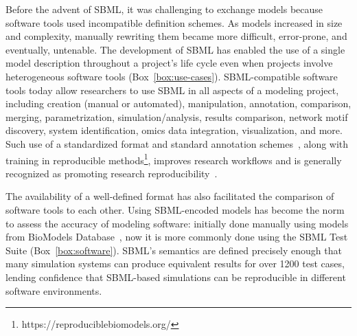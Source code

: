 \documentclass{sbml-paper}
\begin{document}
Before the advent of SBML, it was challenging to exchange models because software tools used incompatible definition schemes.  As models increased in size and complexity, manually rewriting them became more difficult, error-prone, and eventually, untenable.  The development of SBML has enabled the use of a single model description throughout a project's life cycle even when projects involve heterogeneous software tools (Box~\ref{box:use-cases}).  SBML-compatible software tools today allow researchers to use SBML in all aspects of a modeling project, including creation (manual or automated), manipulation, annotation, comparison, merging, parametrization, simulation/analysis, results comparison, network motif discovery, system identification, omics data integration, visualization, and more.  Such use of a standardized format and standard annotation schemes~\citep{Neal2019harmonizing}, along with training in reproducible methods\footnote{https://reproduciblebiomodels.org/}, improves research workflows and is generally recognized as promoting research reproducibility~\citep{Sandve2013ten, Mendes2018reproducible, waltemath2016modeling}.

The availability of a well-defined format has also facilitated the comparison of software tools to each other.  Using SBML-encoded models has become the norm to assess the accuracy of modeling software: initially done manually using models from BioModels Database~\citep{bergmann2008comparing}, now it is more commonly done using the SBML Test Suite (Box~\ref{box:software}).  SBML's semantics are defined precisely enough that many simulation systems can produce equivalent results for over 1200 test cases, lending confidence that SBML-based simulations can be reproducible in different software environments.
\end{document}
